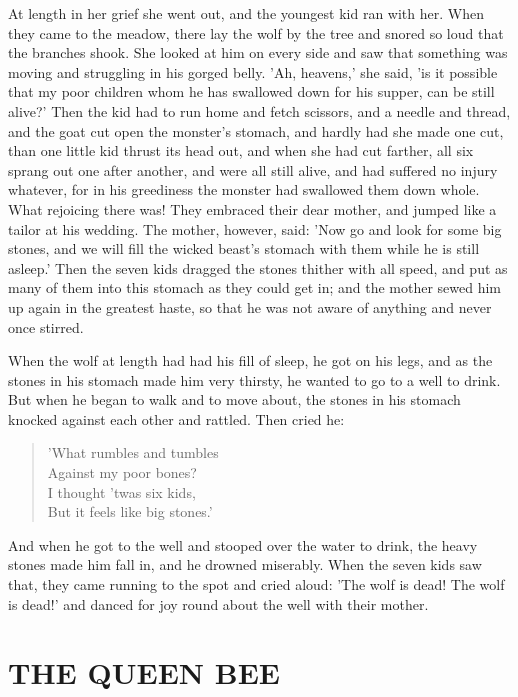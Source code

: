 \documentclass[12pt]{book}
\begin{document}
At length in her grief she went out, and the youngest kid ran with
her. When they came to the meadow, there lay the wolf by the tree and
snored so loud that the branches shook. She looked at him on every
side and saw that something was moving and struggling in his gorged
belly. 'Ah, heavens,' she said, 'is it possible that my poor children
whom he has swallowed down for his supper, can be still alive?' Then
the kid had to run home and fetch scissors, and a needle and thread,
and the goat cut open the monster's stomach, and hardly had she made
one cut, than one little kid thrust its head out, and when she had cut
farther, all six sprang out one after another, and were all still
alive, and had suffered no injury whatever, for in his greediness the
monster had swallowed them down whole. What rejoicing there was! They
embraced their dear mother, and jumped like a tailor at his wedding.
The mother, however, said: 'Now go and look for some big stones, and
we will fill the wicked beast's stomach with them while he is still
asleep.' Then the seven kids dragged the stones thither with all
speed, and put as many of them into this stomach as they could get in;
and the mother sewed him up again in the greatest haste, so that he
was not aware of anything and never once stirred.

When the wolf at length had had his fill of sleep, he got on his legs,
and as the stones in his stomach made him very thirsty, he wanted to
go to a well to drink. But when he began to walk and to move about,
the stones in his stomach knocked against each other and rattled. Then
cried he:

\begin{verse}
 'What rumbles and tumbles\\
  Against my poor bones?\\
  I thought 'twas six kids,\\
  But it feels like big stones.'
\end{verse}

And when he got to the well and stooped over the water to drink, the
heavy stones made him fall in, and he drowned miserably. When the
seven kids saw that, they came running to the spot and cried aloud:
'The wolf is dead! The wolf is dead!' and danced for joy round about
the well with their mother.



\chapter{THE QUEEN BEE}
\end{document}
